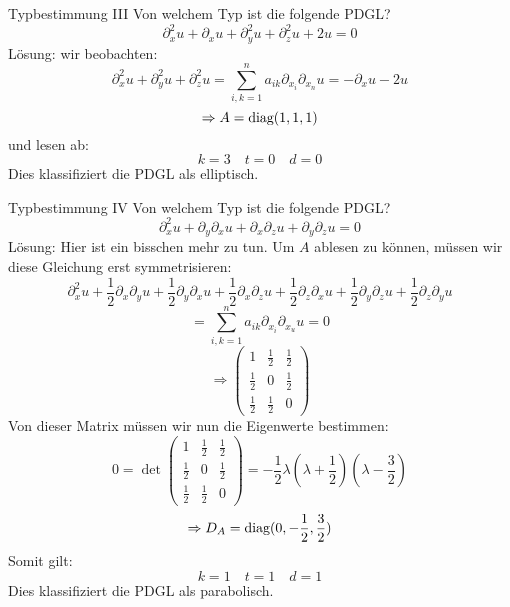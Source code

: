 \begin{Beispiel}{Typbestimmung III}
      Von welchem Typ ist die folgende PDGL?
    $$\partial_x^2 u + \partial_x u +\partial_y^2 u + \partial_z^2 u + 2u = 0$$
    Lösung: wir beobachten:
    $$\partial_x^2 u + \partial_y^2 u + \partial_z^2 u = \sum_{i,k=1}^n a_{ik}\partial_{x_i}\partial_{x_n}u=-\partial_x u - 2u$$
    $$\Rightarrow A=\text{diag}(1,1,1)$$
    und lesen ab:
    $$k=3\quad t=0 \quad d=0$$
    Dies klassifiziert die PDGL als elliptisch.
\end{Beispiel}
\begin{Beispiel}{Typbestimmung IV}
    Von welchem Typ ist die folgende PDGL?
    $$\partial_x^2 u+\partial_y\partial_x u+\partial_x\partial_z u+\partial_y\partial_z u = 0$$
    Lösung: Hier ist ein bisschen mehr zu tun. Um $A$ ablesen zu können, müssen wir diese Gleichung erst symmetrisieren:
    $$\partial_x^2 u+\frac{1}{2}\partial_x\partial_y u + \frac{1}{2}\partial_y\partial_x u + \frac{1}{2}\partial_x\partial_z u+ \frac{1}{2}\partial_z\partial_x u+\frac{1}{2}\partial_y\partial_z u + \frac{1}{2}\partial_z\partial_y u$$
    $$=\sum_{i,k=1}^n a_{ik}\partial_{x_i}\partial_{x_u}u = 0$$
    $$\Rightarrow \begin{pmatrix} 1 & \frac{1}{2} & \frac{1}{2}\\ \frac{1}{2} & 0 & \frac{1}{2} \\ \frac{1}{2} & \frac{1}{2} & 0\end{pmatrix}$$
    Von dieser Matrix müssen wir nun die Eigenwerte bestimmen:
    $$0=\det\begin{pmatrix} 1 & \frac{1}{2} & \frac{1}{2}\\ \frac{1}{2} & 0 & \frac{1}{2} \\ \frac{1}{2} & \frac{1}{2} & 0\end{pmatrix}=-\frac{1}{2}\lambda(\lambda+\frac{1}{2})(\lambda-\frac{3}{2})$$
    $$\Rightarrow D_A=\text{diag}(0, -\frac{1}{2}, \frac{3}{2})$$
    Somit gilt:
    $$k=1 \quad t=1 \quad d=1$$
    Dies klassifiziert die PDGL als parabolisch.
\end{Beispiel}

